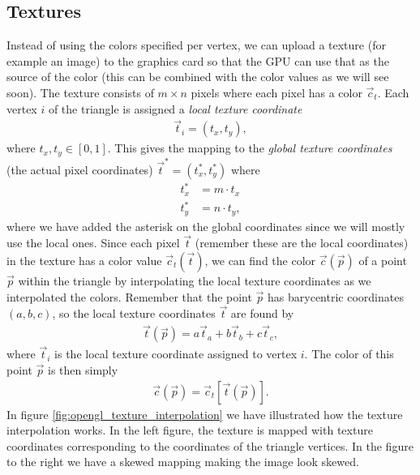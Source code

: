 \subsection{Textures}
Instead of using the colors specified per vertex, we can upload a texture (for example an image) to the graphics card so that the GPU can use that as the source of the color (this can be combined with the color values as we will see soon). The texture consists of $m\times n$ pixels where each pixel has a color $\vec c_t$. Each vertex $i$ of the triangle is assigned a \textit{local texture coordinate} 
\begin{align}
	\vec t_i = (t_x, t_y),
\end{align}
where $t_x, t_y \in [0,1]$. This gives the mapping to the \textit{global texture coordinates} (the actual pixel coordinates) $\vec t^* = (t_x^*, t_y^*)$ where 
\begin{align}
	\nonumber
	t_x^* &= m\cdot t_x\\
	t_y^* &= n\cdot t_y,
\end{align}
where we have added the asterisk on the global coordinates since we will mostly use the local ones. Since each pixel $\vec t$ (remember these are the local coordinates) in the texture has a color value $\vec c_t(\vec t)$, we can find the color $\vec c(\vec p)$ of a point $\vec p$ within the triangle by interpolating the local texture coordinates as we interpolated the colors. Remember that the point $\vec p$ has barycentric coordinates $(a,b,c)$, so the local texture coordinates $\vec t$ are found by
\begin{align}
	\vec t(\vec p) =  a\vec t_a + b\vec t_b + c\vec t_c,
\end{align}
where $\vec t_i$ is the local texture coordinate assigned to vertex $i$. The color of this point $\vec p$ is then simply
\begin{align}
	\vec c(\vec p) = \vec c_t[\vec t(\vec p)].
\end{align}
In figure \ref{fig:opengl_texture_interpolation} we have illustrated how the texture interpolation works. In the left figure, the texture is mapped with  texture coordinates corresponding to the coordinates of the triangle vertices. In the figure to the right we have a skewed mapping making the image look skewed.
